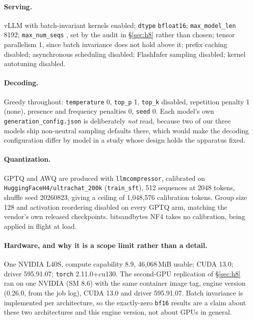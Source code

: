 \documentclass[conference]{IEEEtran}
\begin{document}
\paragraph{Serving.} vLLM \hEightEngine{} with batch-invariant kernels enabled;
\texttt{dtype} \texttt{bfloat16}; \texttt{max\_model\_len} 8192;
\texttt{max\_num\_seqs} \hEightFrozenB{}, set by the audit in \S\ref{sec:h8} rather than
chosen; tensor parallelism 1, since batch invariance does not hold above it; prefix
caching disabled; asynchronous scheduling disabled; FlashInfer sampling disabled;
kernel autotuning disabled.

\paragraph{Decoding.} Greedy throughout: \texttt{temperature} 0, \texttt{top\_p} 1,
\texttt{top\_k} disabled, repetition penalty 1 (none), presence and frequency penalties 0,
\texttt{seed} 0. Each
model's own \texttt{generation\_config.json} is deliberately \emph{not} read, because two
of our three models ship non-neutral sampling defaults there, which would make the
decoding configuration differ by model in a study whose design holds the apparatus fixed.

\paragraph{Quantization.} GPTQ and AWQ are produced with
\texttt{llmcompressor}, calibrated on \texttt{HuggingFaceH4/ultrachat\_200k}
(\texttt{train\_sft}), 512 sequences at 2048 tokens, shuffle seed 20260823, giving a
ceiling of 1{,}048{,}576 calibration tokens. Group size 128 and activation reordering
disabled on every GPTQ arm, matching the vendor's own released checkpoints. bitsandbytes
NF4 takes no calibration, being applied in flight at load.

\paragraph{Hardware, and why it is a scope limit rather than a detail.}
One NVIDIA L40S, compute capability 8.9, 46{,}068\,MiB usable; CUDA 13.0; driver
595.91.07; \texttt{torch} 2.11.0+cu130. The second-GPU replication of \S\ref{sec:h8}
ran on one NVIDIA \hEightSpotGPU{} (SM 8.6) with the same container image tag, engine
version (0.26.0, from the job log), CUDA 13.0 and driver 595.91.07. Batch invariance is implemented per architecture, so the exactly-zero
\texttt{bf16} results are a claim about these two architectures and this engine version,
not about GPUs in general.
\end{document}
